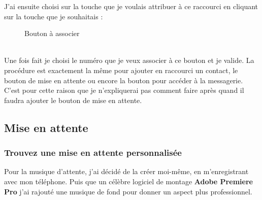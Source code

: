 \documentclass[12pt, a4paper]{article}
\begin{document}
	J'ai ensuite choisi sur la touche que je voulais attribuer à ce raccourci
	en cliquant sur la touche que je souhaitais :
	\begin{figure}[h]
		\centering
		\caption{Bouton à associer}
		\label{fig:btnl}
	\end{figure}\\
	Une fois fait je choisi le numéro que je veux associer à ce bouton 
	et je valide. La procédure est exactement la même pour ajouter en raccourci
	un contact, le bouton de mise en attente ou encore la bouton pour accéder à la 
	messagerie. C'est pour cette raison que je n'expliquerai pas comment faire 
	après quand il faudra ajouter le bouton de mise en attente. 

	\subsection{Mise en attente}
	\subsubsection{Trouvez une mise en attente personnalisée}
	Pour la musique d'attente, j'ai décidé de la créer moi-même, en m'enregistrant
	avec mon téléphone. Puis que un célèbre logiciel de montage \textbf{Adobe Premiere Pro}
	j'ai rajouté une musique de fond pour donner un aspect plus professionnel.\\
\end{document}
